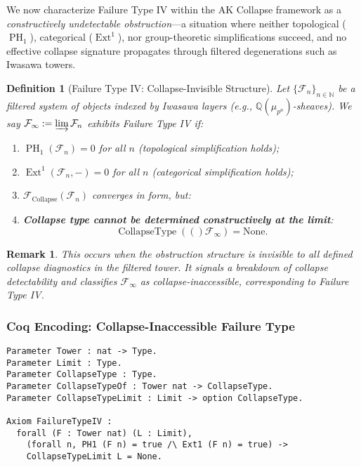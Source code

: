 \documentclass[11pt]{article}
\newtheorem{definition}[theorem]{Definition}
\newtheorem{remark}[theorem]{Remark}
\DeclareMathOperator{\Ext}{Ext}
\DeclareMathOperator{\PH}{PH}
\newcommand{\CollapseTypeOf}[1]{\operatorname{CollapseType}(#1)}
\begin{document}
We now characterize Failure Type IV within the AK Collapse framework as a \emph{constructively undetectable obstruction}—a situation where neither topological ($\PH_1$), categorical ($\Ext^1$), nor group-theoretic simplifications succeed, and no effective collapse signature propagates through filtered degenerations such as Iwasawa towers.

\begin{definition}[Failure Type IV: Collapse-Invisible Structure]
Let $\{ \mathcal{F}_n \}_{n \in \mathbb{N}}$ be a filtered system of objects indexed by Iwasawa layers (e.g., $\mathbb{Q}(\mu_{p^n})$-sheaves). We say $\mathcal{F}_\infty := \varinjlim \mathcal{F}_n$ exhibits \emph{Failure Type IV} if:

\begin{enumerate}
  \item $\PH_1(\mathcal{F}_n) = 0$ for all $n$ (topological simplification holds);
  \item $\Ext^1(\mathcal{F}_n, -) = 0$ for all $n$ (categorical simplification holds);
  \item $\mathcal{F}_{\mathrm{Collapse}}(\mathcal{F}_n)$ converges in form, but:
  \item \textbf{Collapse type cannot be determined constructively at the limit}:
  \[
  \CollapseTypeOf(\mathcal{F}_\infty) = \mathrm{None}.
  \]
\end{enumerate}
\end{definition}

\begin{remark}
This occurs when the obstruction structure is invisible to all defined collapse diagnostics in the filtered tower. It signals a breakdown of collapse detectability and classifies $\mathcal{F}_\infty$ as \emph{collapse-inaccessible}, corresponding to Failure Type IV.
\end{remark}

\subsubsection*{Coq Encoding: Collapse-Inaccessible Failure Type}

\begin{lstlisting}[language=Coq, caption=Failure Type IV: Collapse-Inaccessible Case]
Parameter Tower : nat -> Type.
Parameter Limit : Type.
Parameter CollapseType : Type.
Parameter CollapseTypeOf : Tower nat -> CollapseType.
Parameter CollapseTypeLimit : Limit -> option CollapseType.

Axiom FailureTypeIV :
  forall (F : Tower nat) (L : Limit),
    (forall n, PH1 (F n) = true /\ Ext1 (F n) = true) ->
    CollapseTypeLimit L = None.
\end{lstlisting}
\end{document}
